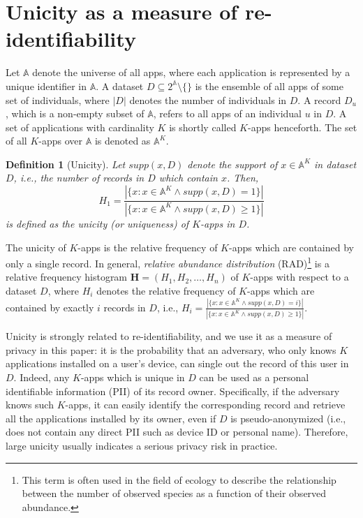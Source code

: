 \documentclass{acm_proc_article-sp}
\theoremstyle{plain}
\newtheorem{definition}{Definition}
\theoremstyle{plain}
\theoremstyle{plain}
\theoremstyle{plain}
\theoremstyle{plain}
\theoremstyle{plain}
\begin{document}
\section{Unicity as a measure of re-identifiability}

Let $\mathbb{A}$ denote the universe of all apps, where each application is represented by a unique identifier in $\mathbb{A}$. A dataset $D\subseteq 2^\mathbb{A} \setminus \{\}$ is the ensemble of all apps of some set of individuals, where $|D|$ denotes the number of individuals in $D$. A record $D_u$, which is a non-empty subset of $\mathbb{A}$, refers to all apps of an individual $u$ in $D$. 
A set of applications with cardinality $K$ is shortly called $K$-apps henceforth. The set of all $K$-apps over $\mathbb{A}$ is denoted as $\mathbb{A}^K$.


\begin{definition}[Unicity]
\label{def:unicity}
Let $\mathit{supp}(x,D)$ denote the support of $x \in \mathbb{A}^K$ in dataset $D$, i.e., the number of records in $D$ which contain $x$. Then, 
$$
H_1 = \frac{|\{x : x \in \mathbb{A}^K \wedge \mathit{supp}(x,D)=1\}|}{|\{x : x \in \mathbb{A}^K \wedge \mathit{supp}(x,D) \geq 1\}|}
$$
is defined as the unicity (or uniqueness) of $K$-apps in $D$.
\end{definition}


The unicity of $K$-apps is the relative frequency of $K$-apps which are contained by only a single record. In general, \emph{relative abundance distribution} (RAD)\footnote{This term is often used in the field of ecology 
to describe the relationship between the number of observed species as a function of their observed abundance.} is a relative frequency histogram $\mathbf{H} = (H_1, H_2, \ldots, H_n)$ of $K$-apps with respect to a dataset $D$, where $H_i$ denotes the relative frequency of $K$-apps which are contained by exactly $i$ records in $D$, i.e., 
$
H_i = \frac{|\{x : x \in \mathbb{A}^K \wedge \mathit{supp}(x,D)=i\}|}{|\{x : x \in \mathbb{A}^K \wedge \mathit{supp}(x,D) \geq 1\}|}
$.


Unicity is strongly related to re-identifiability, and we use it as a measure of privacy in this paper:
it is the probability that an adversary, who only knows $K$ applications installed on a user's device, can single out the record of this user in $D$. 
Indeed,  any $K$-apps which is unique in $D$ can be used as a personal identifiable information (PII) of its record owner. Specifically, if the adversary knows such $K$-apps, it can easily identify the corresponding record and retrieve all the applications installed by its owner, even if $D$ is pseudo-anonymized (i.e., does not contain any direct PII such as device ID or personal name).  
Therefore, large unicity usually indicates a serious privacy risk in practice. 
\end{document}
